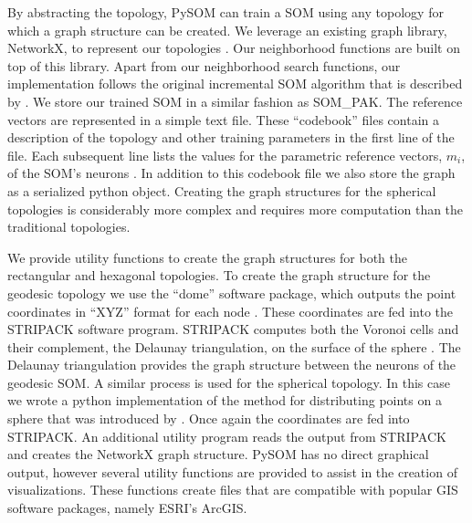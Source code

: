 By abstracting the topology, PySOM can train a SOM using any topology for
which a graph structure can be created. We leverage an existing graph library,
NetworkX, to represent our topologies \citep{networkx}.  Our neighborhood
functions are built on top of this library.  Apart from our neighborhood
search functions, our implementation follows the original incremental SOM
algorithm that is described by \cite{Kohonen2000}.  We store our trained SOM
in a similar fashion as SOM\_PAK.  The reference vectors are represented in a
simple text file.  These ``codebook'' files contain a description of the
topology and other training parameters in the first line of the file.  Each
subsequent line lists the values for the parametric reference vectors, $m_i$,
of the SOM's neurons \citep{kohonen1996}. In addition to this codebook file we
also store the graph as a serialized python object.  Creating the graph
structures for the spherical topologies is considerably more complex and
requires more computation than the traditional topologies.

We provide utility functions to create the graph structures for both the
rectangular and hexagonal topologies.  To create the graph structure for the
geodesic topology we use the ``dome'' software package, which outputs the
point coordinates in ``XYZ'' format for each node \citep{dome}.  These
coordinates are fed into the STRIPACK software program. STRIPACK computes both
the Voronoi cells and their complement, the Delaunay triangulation, on the
surface of the sphere \citep{Ranka97}.  The Delaunay triangulation provides the graph
structure between the neurons of the geodesic SOM.  A similar process is used
for the spherical topology. In this case we wrote a python implementation of
the method for distributing points on a sphere that was introduced by
\cite{Rakhmanov94}.  Once again the coordinates are fed into STRIPACK.
An additional utility program reads the output from STRIPACK and
creates the NetworkX graph structure.  PySOM has no direct graphical
output, however several utility functions are provided to assist in the
creation of visualizations.  These functions create files that are compatible with
popular GIS software packages, namely ESRI's ArcGIS.

